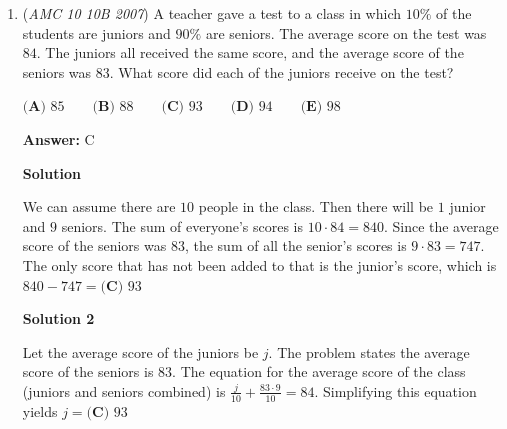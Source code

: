 \begin{enumerate}
 $\textbf{(A) } 125 \qquad\textbf{(B) } 144 \qquad\textbf{(C) } 153 \qquad\textbf{(D) } 173 \qquad\textbf{(E) } 180$

 \textbf{Answer: }D



\textbf{Solution}

The sum of the interior angles of any quadrilateral is $360^\circ.$
 \begin{align*} 360 &= \angle A + \angle B + \angle C + \angle D\\ &= \angle A + \frac{1}{2}A + \frac{1}{3}A + \frac{1}{4}A\\ &= \frac{12}{12}A + \frac{6}{12}A + \frac{4}{12}A + \frac{3}{12}A\\ &= \frac{25}{12}A \end{align*}

 \[\angle A = 360 \cdot \frac{12}{25} = 172.8 \approx \boxed{\mathrm{(D) \ } 173}\]



	\item (\textit{AMC 10 10B 2007}) A teacher gave a test to a class in which $10\%$ of the students are juniors and $90\%$ are seniors. The average score on the test was $84.$ The juniors all received the same score, and the average score of the seniors was $83.$ What score did each of the juniors receive on the test?


 $\textbf{(A) } 85 \qquad\textbf{(B) } 88 \qquad\textbf{(C) } 93 \qquad\textbf{(D) } 94 \qquad\textbf{(E) } 98$

 \textbf{Answer: }C



\textbf{Solution}

We can assume there are $10$ people in the class. Then there will be $1$ junior and $9$ seniors. The sum of everyone's scores is $10 \cdot 84 = 840$. Since the average score of the seniors was $83$, the sum of all the senior's scores is $9 \cdot 83 = 747$. The only score that has not been added to that is the junior's score, which is $840 - 747 = \boxed{\textbf{(C) } 93}$




\textbf{Solution 2}

Let the average score of the juniors be $j$. The problem states the average score of the seniors is $83$. The equation for the average score of the class (juniors and seniors combined) is $\frac{j}{10} + \frac{83 \cdot 9}{10} = 84$. Simplifying this equation yields $j = \boxed{\textbf{(C) } 93}$




\end{enumerate}
